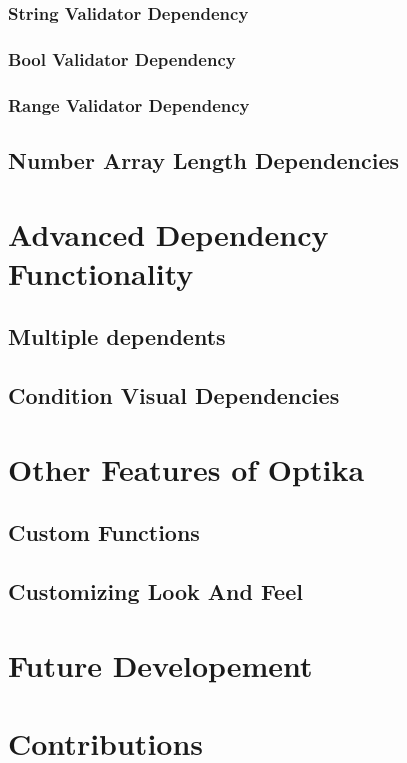 \subsubsection{String Validator Dependency}

\subsubsection{Bool Validator Dependency}

\subsubsection{Range Validator Dependency}


\subsection{Number Array Length Dependencies}





\section{Advanced Dependency Functionality}

\subsection{Multiple dependents}

\subsection{Condition Visual Dependencies}




\section{Other Features of Optika}

\subsection{Custom Functions}

\subsection{Customizing Look And Feel}


\section{Future Developement}

\section{Contributions}
